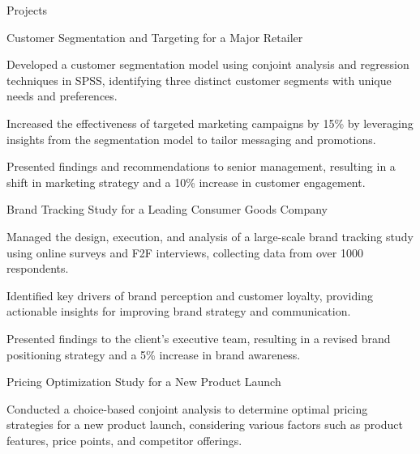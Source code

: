 \documentclass{resume} %
\begin{document}
    \begin{rSection}{Projects}
                    \begin{rSubsection}
                                    {Customer Segmentation and Targeting for a Major Retailer}
                                {}{}{}
                                    \item Developed a customer segmentation model using conjoint analysis and regression techniques in SPSS, identifying three distinct customer segments with unique needs and preferences.
                                    \item Increased the effectiveness of targeted marketing campaigns by 15\% by leveraging insights from the segmentation model to tailor messaging and promotions.
                                    \item Presented findings and recommendations to senior management, resulting in a shift in marketing strategy and a 10\% increase in customer engagement.
                            \end{rSubsection}
                    \begin{rSubsection}
                                    {Brand Tracking Study for a Leading Consumer Goods Company}
                                {}{}{}
                                    \item Managed the design, execution, and analysis of a large{-}scale brand tracking study using online surveys and F2F interviews, collecting data from over 1000 respondents.
                                    \item Identified key drivers of brand perception and customer loyalty, providing actionable insights for improving brand strategy and communication.
                                    \item Presented findings to the client's executive team, resulting in a revised brand positioning strategy and a 5\% increase in brand awareness.
                            \end{rSubsection}
                    \begin{rSubsection}
                                    {Pricing Optimization Study for a New Product Launch}
                                {}{}{}
                                    \item Conducted a choice{-}based conjoint analysis to determine optimal pricing strategies for a new product launch, considering various factors such as product features, price points, and competitor offerings.

\end{rSubsection}
\end{rSection}
\end{document}
